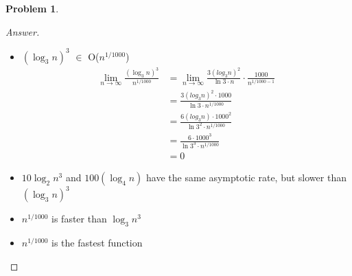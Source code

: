 \documentclass[11pt]{article}
\theoremstyle{definition}
\theoremstyle{definition}
\newtheorem{required}{Problem}
\theoremstyle{definition}
\begin{document}
\begin{required}
\begin{enumerate} [label=(\alph*)]
\begin{proof}[Answer]
\begin{itemize}
\item $(\log_3 n)^3 $ $\in$ O($n^{1/1000}$)\\

\begin{align*}
\lim_{n \to \infty} \frac{(\log_3 n)^3 }{n^{1/1000}} &= \lim_{n \to \infty} \frac {3(log_3 n)^2}{\ln{3}\cdot n} \cdot \frac {1000}{n^{1/1000-1}}\\
&= \frac {3(log_3 n)^2 \cdot 1000}{\ln{3}\cdot n^{1/1000}}\\
&= \frac {6(log_3 n) \cdot 1000^2}{\ln{3}^2\cdot n^{1/1000}}\\
&= \frac {6 \cdot 1000^3}{\ln{3}^3\cdot n^{1/1000}}\\
&= 0
\end{align*}



\item $10 \log_2 n^3$ and $100(\log_4 n) $ have the same asymptotic rate, but slower than $(\log_3 n)^3 $
\item $n^{1/1000}$ is faster than  $\log_3 n^3$
\item $n^{1/1000}$ is the fastest function
\end{itemize}

    \end{proof}
\end{enumerate}

\end{required}

\newpage
\end{document}
